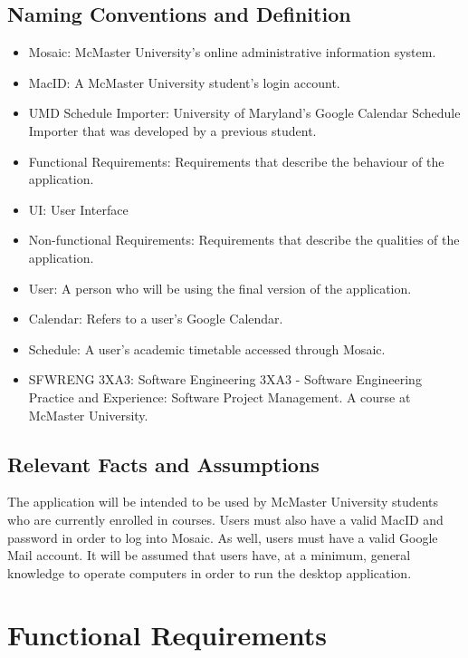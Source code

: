 \documentclass[12pt, titlepage]{article}
\begin{document}
\subsection{Naming Conventions and Definition}
\begin{itemize}
\item Mosaic: McMaster University's online administrative information system.
\item MacID: A McMaster University student's login account.
\item UMD Schedule Importer:  University of Maryland's Google Calendar Schedule Importer that was developed by a previous student.
\item Functional Requirements: Requirements that describe the behaviour of the application.
\item UI: User Interface
\item Non-functional Requirements: Requirements that describe the qualities of the application.
\item User: A person who will be using the final version of the application. 
\item Calendar: Refers to a user's Google Calendar.
\item Schedule: A user's academic timetable accessed through Mosaic.
\item SFWRENG 3XA3: Software Engineering 3XA3 - Software Engineering Practice and Experience: Software Project Management. A course at McMaster University.

\end{itemize}
\subsection{Relevant Facts and Assumptions}

\hspace{5mm}The application will be intended to be used by McMaster University students who are currently enrolled in courses. Users must also have a valid MacID and password in order to log into Mosaic. As well, users must have a valid Google Mail account. It will be assumed that users have, at a minimum, general knowledge to operate computers in order to run the desktop application. 

\section{Functional Requirements}
\end{document}
